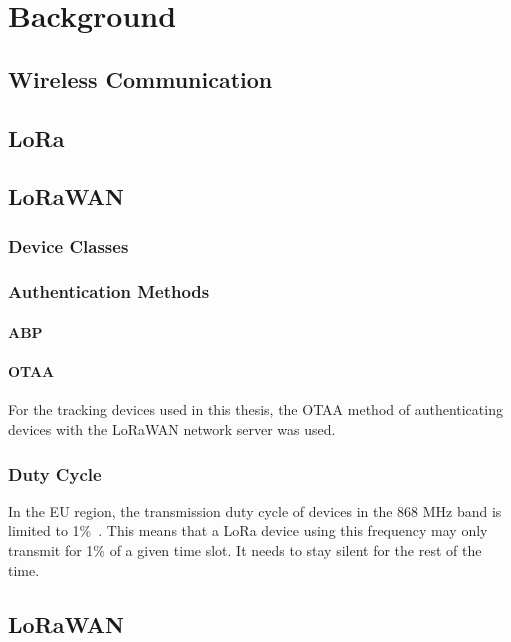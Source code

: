 \chapter{Background}

\section{Wireless Communication}
\section{\acf{LoRa}}


\section{\acf{LoRaWAN}}

\subsection{Device Classes}

\subsection{Authentication Methods}

\subsubsection{\ac{ABP}}

\subsubsection{\ac{OTAA}}

For the tracking devices used in this thesis, the \ac{OTAA} method of authenticating devices with the \ac{LoRaWAN} network server was used.

\subsection{Duty Cycle}


In the \ac{EU} region, the transmission duty cycle of devices in the 868 MHz band is limited to 1\%~\cite{etsi_etsi_2012}.
This means that a \ac{LoRa} device using this frequency may only transmit for 1\% of a given time slot.
It needs to stay silent for the rest of the time.

\section{\acf{LoRaWAN}}

